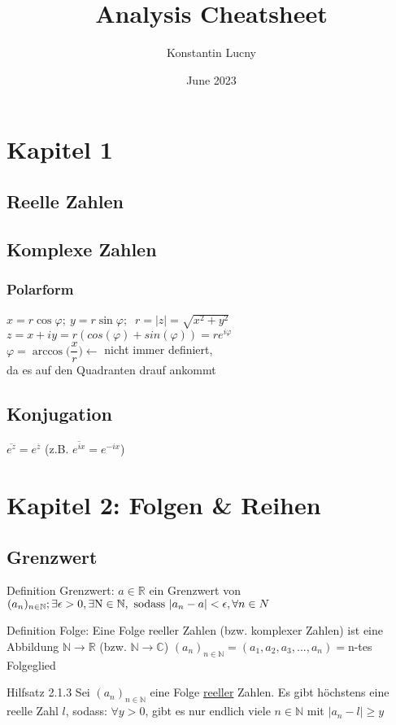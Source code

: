 \documentclass[a4paper,10pt]{article}
\title{Analysis Cheatsheet}
\author{Konstantin Lucny}
\date{June 2023}
\def\R{\mathbb{R}}
\begin{document}
\maketitle



\section{Kapitel 1}
\subsection{Reelle Zahlen}

\subsection{Komplexe Zahlen}
\subsubsection{Polarform}
$ x = r\cos {\varphi};\ y=r\sin{\varphi};\  $ $r=|z|=\sqrt{x^2+y^2}$\\
$z=x+iy=r(cos(\varphi)+sin(\varphi))=re^{i\varphi} $\\
$\varphi=\arccos{\bigg(\dfrac{x}{r}\bigg)} \leftarrow$  nicht immer definiert,\\
da es auf den Quadranten drauf ankommt
\subsection{Konjugation}
$\overline{e^z}=e^{\overline{z}}$ (z.B. $\overline{e^{ix}}=e^{-ix}$)


\section{Kapitel 2: Folgen \& Reihen}
\subsection{Grenzwert}
\begin {defbox}{Definition Grenzwert: } $a \in \R $ ein Grenzwert von $(a_n)_{n\in \mathbb{N}};\\ \exists \epsilon > 0, \exists \text{N} \in \mathbb{N}, \text{ sodass } |a_n-a|<\epsilon, \forall n \in N $ 
\end {defbox}
\begin{defbox}{Definition Folge: } Eine Folge reeller Zahlen (bzw. komplexer Zahlen) ist eine Abbildung $\mathbb{N} \longrightarrow \mathbb{R} $ (bzw. $\mathbb{N}\longrightarrow\mathbb{C}$)
$(a_n)_{n\in \mathbb{N}}=(a_1,a_2,a_3,...,a_n)=$n-tes Folgeglied
\end{defbox}
\begin{tbox}{Hilfsatz 2.1.3}
Sei $(a_n)_{n\in\mathbb{N}}$ eine Folge \underline{reeller} Zahlen. Es gibt höchstens eine reelle Zahl $l$, sodass: $\forall y>0$, gibt es nur endlich viele $n\in \mathbb{N}$ mit $|a_n-l|\ge y$
\end{tbox}
\end{document}

